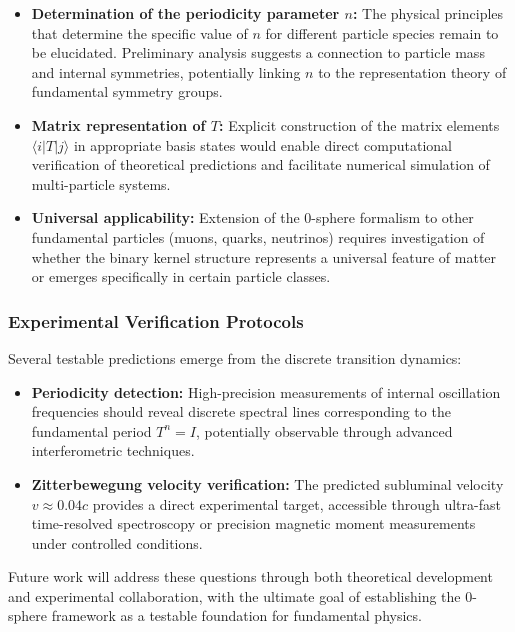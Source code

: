 \documentclass[%
 reprint,
 amsmath,amssymb,
 aps,
]{revtex4-1}
\numberwithin{equation}{section}%
\begin{document}
\begin{itemize}
\item \textbf{Determination of the periodicity parameter $n$:} The physical principles that determine the specific value of $n$ for different particle species remain to be elucidated. Preliminary analysis suggests a connection to particle mass and internal symmetries, potentially linking $n$ to the representation theory of fundamental 
symmetry groups.

\item \textbf{Matrix representation of $T$:} Explicit construction of the matrix elements $\langle i|T|j \rangle$ in appropriate basis states would enable direct computational verification of theoretical predictions and 
facilitate numerical simulation of multi-particle systems.

\item \textbf{Universal applicability:} Extension of the 0-sphere formalism 
to other fundamental particles (muons, quarks, neutrinos) requires investigation of whether the binary kernel structure represents a universal feature of matter or emerges specifically in certain particle classes.
\end{itemize}

\subsubsection{Experimental Verification Protocols}
\label{subsubsec:experimental_verification}

Several testable predictions emerge from the discrete transition dynamics:

\begin{itemize}
\item \textbf{Periodicity detection:} High-precision measurements of internal 
oscillation frequencies should reveal discrete spectral lines corresponding to the fundamental period $T^n = I$, potentially observable through advanced interferometric techniques.

\item \textbf{Zitterbewegung velocity verification:} The predicted subluminal 
velocity $v \approx 0.04c$ provides a direct experimental target, accessible through ultra-fast time-resolved spectroscopy or precision magnetic moment measurements under controlled conditions.
\end{itemize}

Future work will address these questions through both theoretical development and experimental collaboration, with the ultimate goal of establishing the 0-sphere framework as a testable foundation for fundamental physics.
\end{document}
